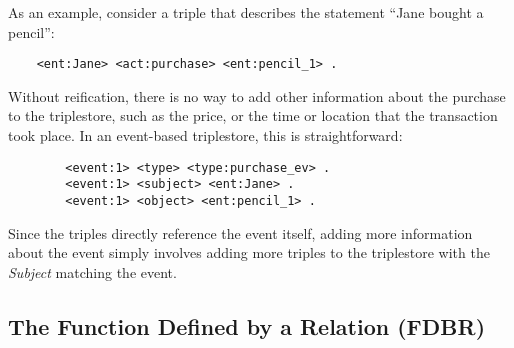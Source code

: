 \documentclass[../main.tex]{subfiles}
\begin{document}
\begin{refsection}
As an example, consider a triple that describes the statement ``Jane bought a pencil'':
\begin{small}
	\begin{verbatim}
    <ent:Jane> <act:purchase> <ent:pencil_1> .
	\end{verbatim}
\end{small}
Without reification, there is no way to add other information about the purchase to the triplestore, such as the price, or the time or location that the transaction took place.
In an event-based triplestore, this is straightforward:
\begin{small}
	\begin{verbatim}
        <event:1> <type> <type:purchase_ev> .
        <event:1> <subject> <ent:Jane> .
        <event:1> <object> <ent:pencil_1> .
	\end{verbatim}
\end{small}
Since the triples directly reference the event itself, adding more information about the event simply involves adding more triples to the triplestore with the \textit{Subject} matching the event.

%
%

\subsection{The Function Defined by a Relation (FDBR)}
\label{subsec:fdbr}


\end{refsection}
\end{document}
